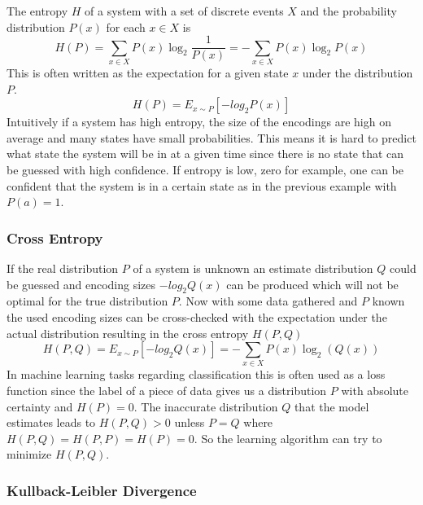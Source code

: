 The entropy $H$ of a system with a set of discrete events $X$ and the probability distribution $P(x)$
for each $x\in X$ is
\begin{equation}
    H(P)=\sum_{x\in X} P(x)\log_{2} \frac{1}{P(x)} = -\sum_{x\in X} P(x)\log_{2} P(x)
\end{equation}
This is often written as the expectation for a  given state $x$ under the distribution $P$.
\[ H(P)=E_{x\sim P}[-log_{2}P(x)]\]
Intuitively if a system has high entropy, the size of the encodings are high on average and many states
have small probabilities. This means it is hard to predict what state the system will be in at a given time
since there is no state that can be guessed with high confidence. If entropy is low, zero for example,
one can be confident that the system is in a certain state as in the previous example with $P(a)=1$.


\subsubsection{Cross Entropy}

If the real distribution $P$ of a system is unknown an estimate distribution $Q$ could be guessed
and encoding sizes $-log_{2}Q(x)$ can be produced which will not be optimal for the true distribution
$P$. Now with some data gathered and $P$ known the used encoding sizes can be cross-checked with the
expectation under the actual distribution resulting in the cross entropy $H(P,Q)$
\begin{equation}
    H(P,Q)=E_{x\sim P}[-log_{2}Q(x)]=-\sum_{x\in X} P(x)\log_{2} (Q(x))
\end{equation}
In machine learning tasks regarding classification this is often used as a loss function since the
label of a piece of data gives us a distribution $P$ with absolute certainty and $H(P)=0$. The
inaccurate distribution $Q$ that the model estimates leads to $H(P,Q) > 0$ unless
$P=Q$ where $H(P,Q)=H(P,P)=H(P)=0$. So the learning algorithm can try to minimize $H(P,Q)$.

\subsubsection{Kullback-Leibler Divergence}

